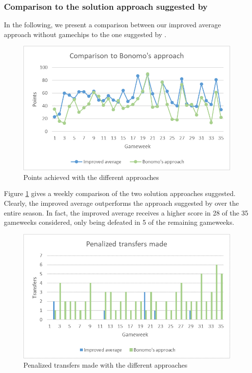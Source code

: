 \subsubsection{Comparison to the solution approach suggested by \cite{Bonomo}}
In the following, we present a comparison between our improved average approach without gamechips to the one suggested by \cite{Bonomo}.
\begin{figure}[H]
    \centering
    \includegraphics[scale=0.80]{fig/chapter_7/Points_vs_bonomo.png}
    \caption{Points achieved with the different approaches}
\label{Points_Bonomo}    
\end{figure}
Figure \ref{Points_Bonomo} gives a weekly comparison of the two solution approaches suggested. Clearly, the improved average outperforms the approach suggested by \cite{Bonomo} over the entire season. In fact, the improved average receives a higher score in 28 of the 35 gameweeks considered, only being defeated in 5 of the remaining gameweeks.
\begin{figure}[H]
    \centering
    \includegraphics[scale=0.80]{fig/chapter_7/Transfers_vs_Bonomo.png}
    \caption{Penalized transfers made with the different approaches}
\label{Transfers_Bonomo}    
\end{figure}
